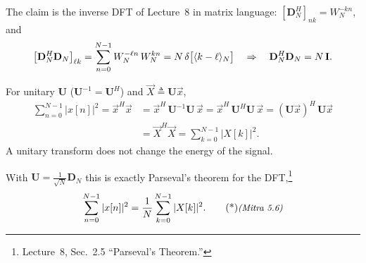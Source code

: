 \documentclass[handout_subfiles_root.tex]{subfiles}
\begin{document}
\begin{notebox}[title=\HandoutNoteAddendumTitle]
The claim is the inverse DFT of Lecture~8 in matrix language: $[\mathbf{D}_N^H]_{nk} = W_N^{-kn}$, and
\begin{equation*}
\big[\mathbf{D}_N^H\mathbf{D}_N\big]_{\ell k} = \sum_{n=0}^{N-1} W_N^{-\ell n}\,W_N^{kn} = N\,\delta\big[\langle k-\ell\rangle_{N}\big]
\quad\Rightarrow\quad \mathbf{D}_N^H\mathbf{D}_N = N\,\mathbf{I}.
\end{equation*}
\end{notebox}

\begin{factbox}[title={Property (energy preservation)}]
For unitary $\mathbf{U}$ ($\mathbf{U}^{-1} = \mathbf{U}^{H}$) and $\vec{X}\triangleq\mathbf{U}\vec{x}$,
\begin{align*}
\sum_{n=0}^{N-1}|x[n]|^2 = \vec{x}^H\vec{x}
&= \vec{x}^H\,\mathbf{U}^{-1}\mathbf{U}\,\vec{x}
 = \vec{x}^H\,\mathbf{U}^{H}\mathbf{U}\,\vec{x}
 = (\mathbf{U}\vec{x})^H\,\mathbf{U}\vec{x} \\
&= \vec{X}^H\vec{X} = \sum_{k=0}^{N-1}|X[k]|^2.
\end{align*}
A unitary transform does not change the energy of the signal.
\end{factbox}
\noindent With $\mathbf{U}=\frac{1}{\sqrt N}\mathbf{D}_N$ this is exactly Parseval's theorem for the DFT,\footnote{Lecture~8, Sec.~2.5 ``Parseval's Theorem.''}
\begin{equation*}
\sum_{n=0}^{N-1}|x[n]|^2 = \frac{1}{N}\sum_{k=0}^{N-1}|X[k]|^2. \MitraTag{5.6}
\end{equation*}
\end{document}
